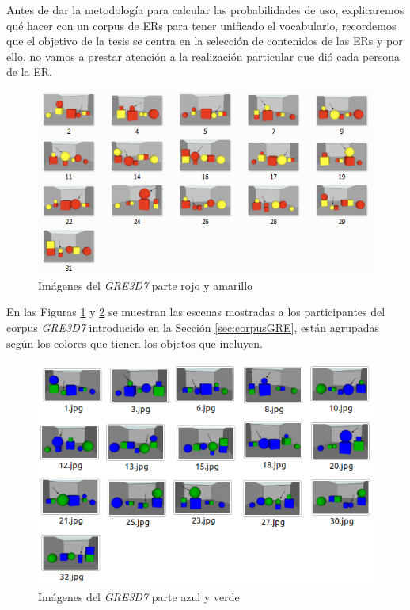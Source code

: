 Antes de dar la metodolog\'ia para calcular las probabilidades de uso, explicaremos qu\'e hacer con un corpus de ERs para tener unificado el vocabulario, recordemos que el objetivo de la tesis se centra en la selecci\'on de contenidos de las ERs y por ello, no vamos a prestar atenci\'on a la realizaci\'on particular que di\'o cada persona de la ER. 


\begin{figure}[H]
\centering
\includegraphics[width=1\textwidth]{images/rojo-amarillo.png}
\caption{Im\'agenes del \textit{GRE3D7} parte rojo y amarillo}
\label{rojo-amarillo}
\end{figure}

En las Figuras \ref{rojo-amarillo} y \ref{verde-azul} se muestran las escenas mostradas a los participantes del corpus \textit{GRE3D7} introducido en la Secci\'on \ref{sec:corpusGRE}, est\'an agrupadas seg\'un los colores que tienen los objetos que incluyen.

\begin{figure}[H]
\centering
\includegraphics[width=1\textwidth]{images/imagenesML.png}
\caption{Im\'agenes del \textit{GRE3D7} parte azul y verde}
\label{verde-azul}
\end{figure}

